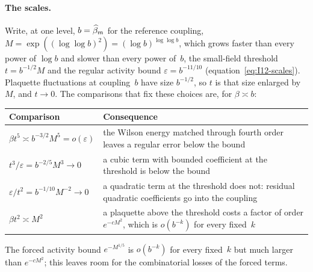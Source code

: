 \paragraph{The scales.}
Write, at one level, $b=\widehat{\beta}_m$ for the reference coupling, $M=\exp((\log\log b)^2)=(\log b)^{\log\log b}$, which grows faster than every power of $\log b$ and slower than every power of~$b$, the small-field threshold $t=b^{-1/2}M$ and the regular activity bound $\varepsilon=b^{-11/10}$ (equation~\eqref{eq:I12-scales}). Plaquette fluctuations at coupling~$b$ have size $b^{-1/2}$, so $t$ is that size enlarged by~$M$, and $t\to0$. The comparisons that fix these choices are, for $\beta\asymp b$:
\begin{center}\small
\begin{tabular}{@{}p{}p{}@{}}
\toprule
Comparison & Consequence\\
\midrule
$\beta t^5\asymp b^{-3/2}M^5=o(\varepsilon)$ & the Wilson energy matched through fourth order leaves a regular error below the bound\\
$t^3/\varepsilon=b^{-2/5}M^3\to0$ & a cubic term with bounded coefficient at the threshold is below the bound\\
$\varepsilon/t^2=b^{-1/10}M^{-2}\to0$ & a quadratic term at the threshold does not: residual quadratic coefficients go into the coupling\\
$\beta t^2\asymp M^2$ & a plaquette above the threshold costs a factor of order $e^{-cM^2}$, which is $o(b^{-k})$ for every fixed~$k$\\
\bottomrule
\end{tabular}
\end{center}
The forced activity bound $e^{-M^{1/5}}$ is $o(b^{-k})$ for every fixed~$k$ but much larger than $e^{-cM^2}$; this leaves room for the combinatorial losses of the forced terms.


